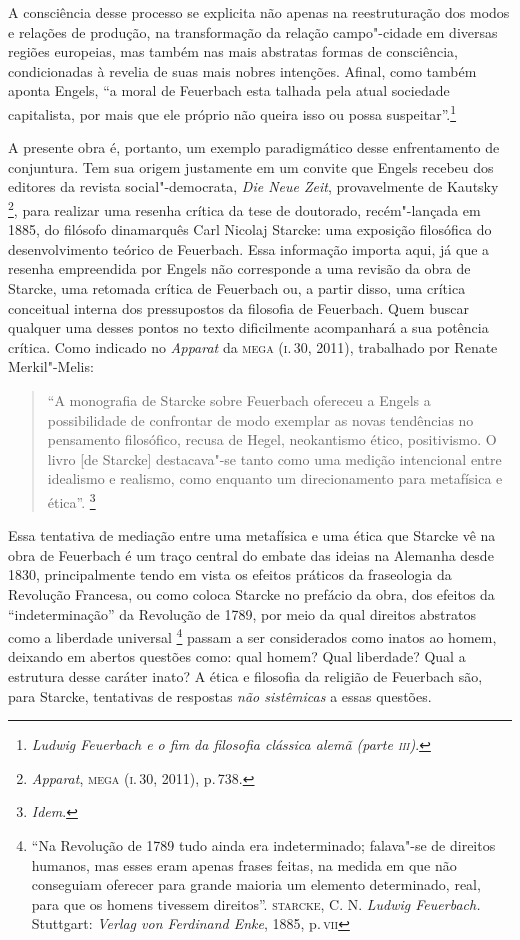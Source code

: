 A consciência desse processo se explicita não apenas na reestruturação
dos modos e relações de produção, na transformação da relação
campo"-cidade em diversas regiões europeias, mas também nas mais
abstratas formas de consciência, condicionadas à revelia de suas mais
nobres intenções. Afinal, como também aponta Engels, ``a moral
de Feuerbach esta
talhada pela atual sociedade capitalista, por mais que ele próprio não
queira isso ou possa suspeitar''.\footnote{\emph{Ludwig Feuerbach e o
  fim da filosofia clássica alemã (parte \textsc{iii})}.}

A presente obra é, portanto, um exemplo paradigmático desse
enfrentamento de conjuntura. Tem sua origem justamente em um convite que
Engels recebeu dos editores da revista social"-democrata, \emph{Die Neue
Zeit}, provavelmente de Kautsky \footnote{\emph{Apparat}, \textsc{mega} (\textsc{i}.\,30,
  2011), p.\,738.}, para realizar uma resenha crítica da tese de
doutorado, recém"-lançada em 1885, do filósofo dinamarquês Carl Nicolaj
Starcke: uma exposição filosófica do desenvolvimento teórico de
Feuerbach. Essa informação importa aqui, já que a resenha empreendida
por Engels não corresponde a uma revisão da obra de Starcke, uma
retomada crítica de Feuerbach ou, a partir disso, uma crítica conceitual
interna dos pressupostos da filosofia de Feuerbach. Quem buscar qualquer
uma desses pontos no texto dificilmente acompanhará a sua potência
crítica. Como indicado no \emph{Apparat} da \textsc{mega} (\textsc{i}.\,30, 2011),
trabalhado por Renate Merkil"-Melis:

\begin{quote}
``A monografia de Starcke sobre Feuerbach ofereceu a Engels a
possibilidade de confrontar de modo exemplar as novas tendências no
pensamento filosófico, recusa de Hegel, neokantismo ético, positivismo.
O livro {[}de Starcke{]} destacava"-se tanto como uma medição intencional
entre idealismo e realismo, como enquanto um direcionamento para
metafísica e ética''. \footnote{\emph{Idem}.}
\end{quote}

Essa tentativa de mediação entre uma metafísica e uma ética que Starcke
vê na obra de Feuerbach é um traço central do embate das ideias na
Alemanha desde 1830, principalmente tendo em vista os efeitos práticos
da fraseologia da Revolução Francesa, ou como coloca Starcke no prefácio
da obra, dos efeitos da ``indeterminação'' da Revolução de 1789, por
meio da qual direitos abstratos como a liberdade universal \footnote{``Na
  Revolução de 1789 tudo ainda era indeterminado; falava"-se de direitos
  humanos, mas esses eram apenas frases feitas, na medida em que não
  conseguiam oferecer para grande maioria um elemento determinado, real,
  para que os homens tivessem direitos''. \textsc{starcke}, C. N. \emph{Ludwig
  Feuerbach.} Stuttgart: \emph{Verlag von Ferdinand Enke}, 1885, p.\,\textsc{vii}}
passam a ser considerados como inatos ao homem, deixando em abertos
questões como: qual homem? Qual liberdade? Qual a estrutura desse
caráter inato? A ética e filosofia da religião de Feuerbach são, para
Starcke, tentativas de respostas \emph{não sistêmicas} a essas questões.

